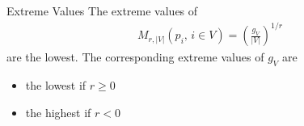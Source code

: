 \documentclass[aspectratio=169]{beamer}
\begin{document}



\begin{frame}{Extreme Values}
The extreme values of
\begin{align*}
M_{r,|V|}(p_i,\,i\in V) = \left(\frac{g_V}{|V|}\right)^{1/r}
\end{align*}
are the lowest. The corresponding extreme values of $g_V$ are
\begin{itemize}
\item the lowest if $r\geq 0$
\item the highest if $r<0$
\end{itemize}
\end{frame}





\end{document}
